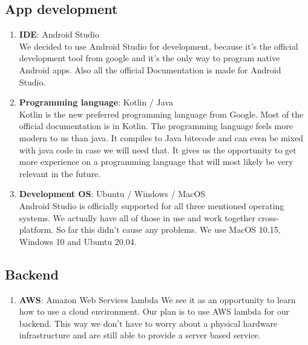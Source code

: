 \documentclass[conference]{IEEEtran}
\numberwithin{figure}{subsection}
\begin{document}
\subsection{App development}
\begin{enumerate}
 \item \textbf{IDE}: Android Studio\\
    We decided to use Android Studio for development, because it's the official development tool from google and it's the only way to program native Android apps. Also all the official Documentation is made for Android Studio.\\
 
 \item \textbf{Programming language}: Kotlin / Java\\
    Kotlin is the new preferred programming language from Google. Most of the official documentation is in Kotlin. The programming language feels more modern to us than java. It compiles to Java bitecode and can even be mixed with java code in case we will need that. It gives us the opportunity to get more experience on a programming language that will most likely be very relevant in the future.\\
 
 \item \textbf{Development OS}: Ubuntu / Windows / MacOS\\
    Android Studio is officially supported for all three mentioned operating systems. We actually have all of those in use and work together cross-platform. So far this didn't cause any problems. We use MacOS 10.15, Windows 10 and Ubuntu 20.04.\\
 \end{enumerate}

\subsection{Backend}
\begin{enumerate}
 \item \textbf{AWS}: Amazon Web Services lambda
 \newline We see it as an opportunity to learn how to use a cloud environment. Our plan is to use AWS lambda for our backend. This way we don't have to worry about a physical hardware infrastructure and are still able to provide a server based service.\\
 
\end{enumerate}
\end{document}
